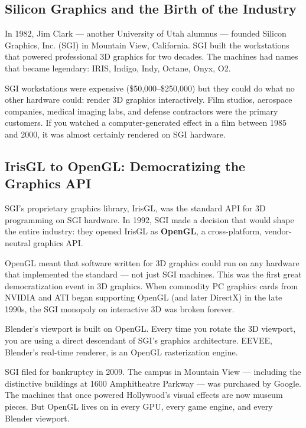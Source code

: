 \documentclass[11pt,letterpaper,twoside,openright]{book}
\begin{document}
\subsection{Silicon Graphics and the Birth of the Industry}

In 1982, Jim Clark --- another University of Utah alumnus --- founded Silicon Graphics, Inc. (SGI) in Mountain View, California. SGI built the workstations that powered professional 3D graphics for two decades. The machines had names that became legendary: IRIS, Indigo, Indy, Octane, Onyx, O2.

SGI workstations were expensive (\$50,000--\$250,000) but they could do what no other hardware could: render 3D graphics interactively. Film studios, aerospace companies, medical imaging labs, and defense contractors were the primary customers. If you watched a computer-generated effect in a film between 1985 and 2000, it was almost certainly rendered on SGI hardware.

\subsection{IrisGL to OpenGL: Democratizing the Graphics API}

SGI's proprietary graphics library, IrisGL, was the standard API for 3D programming on SGI hardware. In 1992, SGI made a decision that would shape the entire industry: they opened IrisGL as \textbf{OpenGL}, a cross-platform, vendor-neutral graphics API.

OpenGL meant that software written for 3D graphics could run on any hardware that implemented the standard --- not just SGI machines. This was the first great democratization event in 3D graphics. When commodity PC graphics cards from NVIDIA and ATI began supporting OpenGL (and later DirectX) in the late 1990s, the SGI monopoly on interactive 3D was broken forever.

Blender's viewport is built on OpenGL. Every time you rotate the 3D viewport, you are using a direct descendant of SGI's graphics architecture. EEVEE, Blender's real-time renderer, is an OpenGL rasterization engine.

\begin{historynote}
SGI filed for bankruptcy in 2009. The campus in Mountain View --- including the distinctive buildings at 1600 Amphitheatre Parkway --- was purchased by Google. The machines that once powered Hollywood's visual effects are now museum pieces. But OpenGL lives on in every GPU, every game engine, and every Blender viewport.
\end{historynote}
\end{document}
